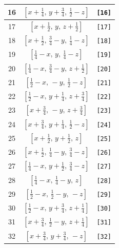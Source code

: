\documentclass[fleqn,8pt]{jsarticle}
\begin{document}
\begin{longtable}{ccc}
16 & $\left[ x + \frac{1}{4},\, y + \frac{3}{4},\, \frac{1}{2} - z \right]$ & {\tt [16]} \\ \hline
17 & $\left[ x + \frac{1}{2},\, y,\, z + \frac{1}{2} \right]$ & {\tt [17]} \\ \hline
18 & $\left[ x + \frac{1}{2},\, \frac{3}{4} - y,\, \frac{1}{4} - z \right]$ & {\tt [18]} \\ \hline
19 & $\left[ \frac{1}{4} - x,\, y,\, \frac{1}{4} - z \right]$ & {\tt [19]} \\ \hline
20 & $\left[ \frac{1}{4} - x,\, \frac{3}{4} - y,\, z + \frac{1}{2} \right]$ & {\tt [20]} \\ \hline
21 & $\left[ \frac{1}{2} - x,\, - y,\, \frac{1}{2} - z \right]$ & {\tt [21]} \\ \hline
22 & $\left[ \frac{1}{2} - x,\, y + \frac{1}{4},\, z + \frac{3}{4} \right]$ & {\tt [22]} \\ \hline
23 & $\left[ x + \frac{3}{4},\, - y,\, z + \frac{3}{4} \right]$ & {\tt [23]} \\ \hline
24 & $\left[ x + \frac{3}{4},\, y + \frac{1}{4},\, \frac{1}{2} - z \right]$ & {\tt [24]} \\ \hline
25 & $\left[ x + \frac{1}{2},\, y + \frac{1}{2},\, z \right]$ & {\tt [25]} \\ \hline
26 & $\left[ x + \frac{1}{2},\, \frac{1}{4} - y,\, \frac{3}{4} - z \right]$ & {\tt [26]} \\ \hline
27 & $\left[ \frac{1}{4} - x,\, y + \frac{1}{2},\, \frac{3}{4} - z \right]$ & {\tt [27]} \\ \hline
28 & $\left[ \frac{1}{4} - x,\, \frac{1}{4} - y,\, z \right]$ & {\tt [28]} \\ \hline
29 & $\left[ \frac{1}{2} - x,\, \frac{1}{2} - y,\, - z \right]$ & {\tt [29]} \\ \hline
30 & $\left[ \frac{1}{2} - x,\, y + \frac{3}{4},\, z + \frac{1}{4} \right]$ & {\tt [30]} \\ \hline
31 & $\left[ x + \frac{3}{4},\, \frac{1}{2} - y,\, z + \frac{1}{4} \right]$ & {\tt [31]} \\ \hline
32 & $\left[ x + \frac{3}{4},\, y + \frac{3}{4},\, - z \right]$ & {\tt [32]} \\
\end{longtable}
\end{document}
